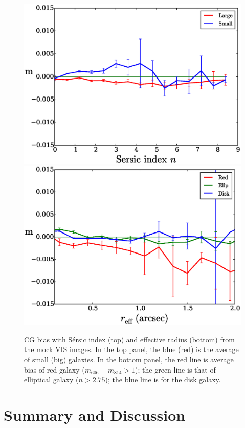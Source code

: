 \documentclass[useAMS,usenatbib]{mnras}
\begin{document}
\begin{figure}
\includegraphics[width=\hsize]{z2s-ne29.eps}
\includegraphics[width=\hsize]{z2nscl-re29.eps}
\caption{CG bias with S{\'e}rsic index (top) and effective radius (bottom)
  from the mock VIS images.
  In the top panel, the blue (red) is the average of small
  (big) galaxies. In the bottom panel, the red line is average bias of
  red galaxy ($m_{606}-m_{814}>1$); the green line is that of elliptical
  galaxy ($n>2.75$); the blue line is for the disk galaxy.}
\label{fig:cg2re}
\end{figure}
%

\section{Summary and Discussion}
\end{document}
